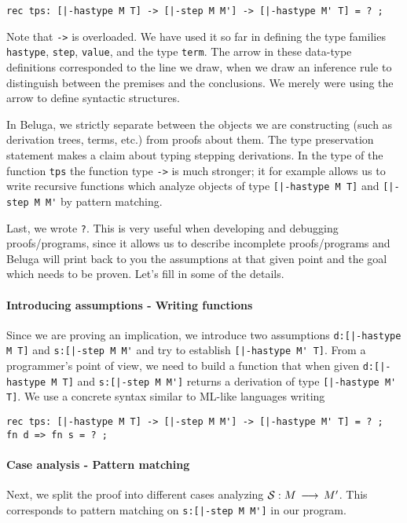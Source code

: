 \begin{lstlisting}
rec tps: [|-hastype M T] -> [|-step M M'] -> [|-hastype M' T] = ? ;
\end{lstlisting}

Note that \lstinline!->! is overloaded. We have used it so far in defining
the type families \lstinline!hastype!, \lstinline!step!,
\lstinline!value!, and the type \lstinline!term!. The arrow in these
data-type definitions corresponded to the line we draw, when we draw an
inference rule to distinguish between the premises and the
conclusions. We merely were using the arrow to define syntactic
structures.

In Beluga, we strictly separate between the objects we are
constructing (such as derivation trees, terms, etc.) from proofs about
them. The type preservation statement makes a claim about typing
stepping derivations. In the type of the function \lstinline!tps! the
function type \lstinline!->! is much stronger; it for example allows us to write
recursive functions which analyze objects of type \lstinline![|-hastype M T]! and
\lstinline![|-step M M'! by pattern matching.

Last, we wrote \lstinline!?!. This is very useful when developing and
debugging proofs/programs, since it allows us to describe incomplete
proofs/programs and Beluga will print back to you the assumptions at
that given point and the goal which needs to be proven.
Let's fill in some of the details.

\paragraph{Introducing assumptions - Writing functions} Since we are proving an
implication, we introduce two assumptions \lstinline!d:[|-hastype M T]! and
\lstinline!s:[|-step M M'! and try to establish
\lstinline![|-hastype M' T]!. From a programmer's point of view, we need
to build a function that when given \lstinline!d:[|-hastype M T]! and
\lstinline!s:[|-step M M']! returns a derivation of type
\lstinline![|-hastype M' T]!. We use a concrete syntax similar to
ML-like languages writing

\begin{lstlisting}
rec tps: [|-hastype M T] -> [|-step M M'] -> [|-hastype M' T] = ? ;
fn d => fn s = ? ;
\end{lstlisting}


\paragraph{Case analysis - Pattern matching} Next, we split the proof
into different cases analyzing ${\mathcal{S}} : M \mathrel{\,\longrightarrow\,} M'$. This corresponds
to pattern matching on \lstinline!s:[|-step M M']! in our program.

